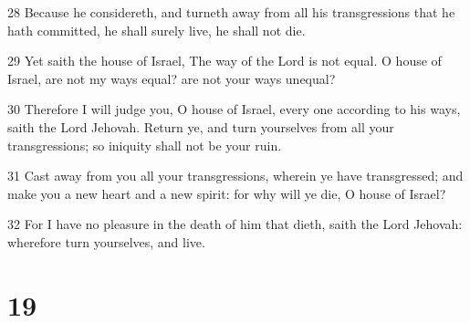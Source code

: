 \par 28 Because he considereth, and turneth away from all his transgressions that he hath committed, he shall surely live, he shall not die.
\par 29 Yet saith the house of Israel, The way of the Lord is not equal. O house of Israel, are not my ways equal? are not your ways unequal?
\par 30 Therefore I will judge you, O house of Israel, every one according to his ways, saith the Lord Jehovah. Return ye, and turn yourselves from all your transgressions; so iniquity shall not be your ruin.
\par 31 Cast away from you all your transgressions, wherein ye have transgressed; and make you a new heart and a new spirit: for why will ye die, O house of Israel?
\par 32 For I have no pleasure in the death of him that dieth, saith the Lord Jehovah: wherefore turn yourselves, and live.

\chapter{19}

